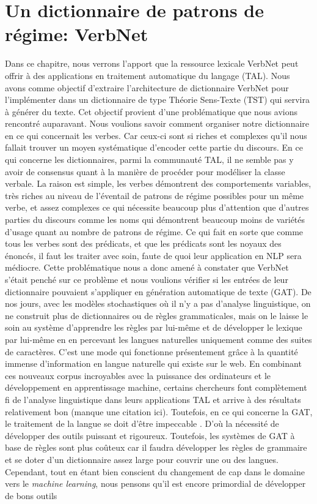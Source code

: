 
\chapter{Un dictionnaire de patrons de régime: VerbNet}

Dans ce chapitre, nous verrons l'apport que la ressource lexicale VerbNet peut offrir à des applications en traitement automatique du langage (TAL). Nous avons comme objectif d'extraire l'architecture de dictionnaire VerbNet pour l'implémenter dans un dictionnaire de type Théorie Sens-Texte (TST) qui servira à générer du texte. Cet objectif provient d'une problématique que nous avions rencontré auparavant. Nous voulions savoir comment organiser notre dictionnaire en ce qui concernait les verbes. Car ceux-ci sont si riches et complexes qu'il nous fallait trouver un moyen systématique d'encoder cette partie du discours. En ce qui concerne les dictionnaires, parmi la communauté TAL,  il ne semble pas y avoir de consensus quant à la manière de procéder pour modéliser la classe verbale. La raison est simple,  les verbes démontrent des comportements variables, très riches au niveau de l'éventail de patrons de régime possibles pour un même verbe, et assez complexes ce qui nécessite beaucoup plus d'attention que d'autres parties du discours comme les noms qui démontrent beaucoup moins de variétés d'usage quant au nombre de patrons de régime. Ce qui fait en sorte que comme tous les verbes sont des prédicats, et que les prédicats sont les noyaux des énoncés, il faut les traiter avec soin, faute de quoi leur application en NLP sera médiocre. Cette problématique nous a donc amené à constater que VerbNet s'était penché sur ce problème et nous voulions vérifier si les entrées de leur dictionnaire pouvaient s'appliquer en génération automatique de texte (GAT). De nos jours, avec les modèles stochastiques où il n'y a pas d'analyse linguistique, on ne construit plus de dictionnaires ou de règles grammaticales, mais on le laisse le soin au système d'apprendre les règles par lui-même et de développer le lexique par lui-même en en percevant les langues naturelles uniquement comme des suites de caractères. C'est une mode qui fonctionne présentement grâce à la quantité immense d'information en langue naturelle qui existe sur le web. En combinant ces nouveaux corpus incroyables avec la puissance des ordinateurs et le développement en apprentissage machine, certains chercheurs font complètement fi de l'analyse linguistique dans leurs applications TAL et arrive à des résultats relativement bon (manque une citation ici). Toutefois, en ce qui concerne la GAT, le traitement de la langue se doit d'être impeccable \citep{lareau18}. D'où la nécessité de développer des outils puissant et rigoureux. Toutefois, les systèmes de GAT à base de règles sont plus coûteux car il faudra développer les règles de grammaire et se doter d'un dictionnaire assez large pour couvrir une ou des langues. Cependant, tout en étant bien conscient du changement de cap dans le domaine vers le \emph{machine learning}, nous pensons qu'il est encore primordial de développer de bons outils 